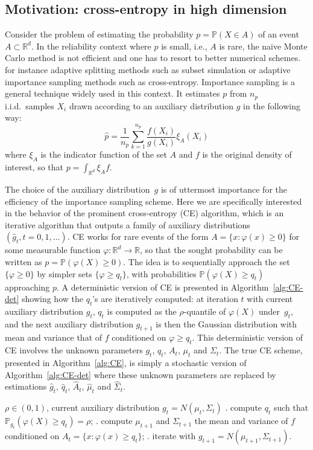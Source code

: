 \documentclass[]{article}
\newcommand{\nfin}{{n_p}}
\renewcommand{\P}{\mathbb{P}}
\newcommand{\R}{\mathbb{R}}
\theoremstyle{plain}
\theoremstyle{definition}
\begin{document}
\subsection{Motivation: cross-entropy in high dimension}

Consider the problem of estimating the probability $p = \P(X \in A)$ of an event $A \subset \R^d$. In the reliability context where $p$ is small, i.e., $A$ is rare, the naive Monte Carlo method is not efficient and one has to resort to better numerical schemes. for instance adaptive splitting methods such as subset simulation or adaptive importance sampling methods such as cross-entropy. Importance sampling is a general technique widely used in this context. It estimates $p$ from $\nfin$ i.i.d.\ samples $X_i$ drawn according to an auxiliary distribution $g$ in the following way:
\begin{equation} \label{eq:IS}
	\hat p = \frac{1}{\nfin} \sum_{k=1}^\nfin \frac{f(X_i)}{g(X_i)} \xi_A(X_i)
\end{equation}
where $\xi_A$ is the indicator function of the set $A$ and $f$ is the original density of interest, so that $p = \int_{\R^d} \xi_A f$. 

The choice of the auxiliary distribution~$g$ is of uttermost importance for the efficiency of the importance sampling scheme. Here we are specifically interested in the behavior of the prominent cross-entropy (CE) algorithm, which is an iterative algorithm that outputs a family of auxiliary distributions $(\hat g_t, t = 0, 1, \dots)$. CE works for rare events of the form $A = \{x: \varphi(x) \geq 0\}$ for some measurable function $\varphi: \R^d \to \R$, so that the sought probability can be written as $p = \P(\varphi(X) \geq 0)$. The idea is to sequentially approach the set $\{\varphi \geq 0\}$ by simpler sets $\{\varphi \geq q_t\}$, with probabilities $\P(\varphi(X) \geq q_t)$ approaching $p$. A deterministic version of CE is presented in Algorithm~\ref{alg:CE-det} showing how the $q_t$'s are iteratively computed: at iteration $t$ with current auxiliary distribution $g_t$, $q_t$ is computed as the $\rho$-quantile of $\varphi(X)$ under~$g_t$, and the next auxiliary distribution $g_{t+1}$ is then the Gaussian distribution with mean and variance that of $f$ conditioned on $\varphi \geq q_t$. This deterministic version of CE involves the unknown parameters $g_t$, $q_t$, $A_t$, $\mu_t$ and $\Sigma_t$. The true CE scheme, presented in Algorithm~\ref{alg:CE}, is simply a stochastic version of Algorithm~\ref{alg:CE-det} where these unknown parameters are replaced by estimations $\hat g_t$, $\hat q_t$, $\hat A_t$, $\hat \mu_t$ and $\hat \Sigma_t$.
%
\begin{algorithm}[t]
\caption{One iteration of the deterministic version of CE} \label{alg:CE-det}
\begin{algorithmic}
\Require $\rho \in (0,1)$, current auxiliary distribution $g_t = N(\mu_t, \Sigma_t)$
. compute $q_t$ such that $\P_{g_t}(\varphi(X) \geq q_t) = \rho$;
. compute $\mu_{t+1}$ and $\Sigma_{t+1}$ the mean and variance of $f$ conditioned on $A_t = \{x: \varphi(x) \geq q_t\}$;
. iterate with $g_{t+1} = N(\mu_{t+1}, \Sigma_{t+1})$.
\end{algorithmic}
\end{algorithm}
\end{document}
